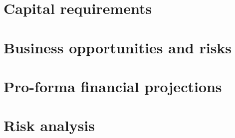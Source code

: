 \documentclass{article}
\begin{document}

\section{Capital requirements}
\section{Business opportunities and risks}
\section{Pro-forma financial projections}
\section{Risk analysis}
\end{document}
